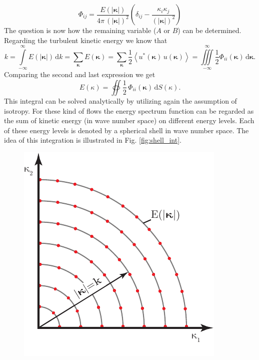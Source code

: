 \documentclass[preprint,12pt,ntfdMod]{elsarticle}
\begin{document}
\begin{par}
  \begin{equation}
  	\Phi_{ij}=\frac{E(|\boldsymbol\kappa|)}{4\pi\,(|\boldsymbol\kappa|)^2}\left(\delta_{ij}
  	-\frac{\kappa_i\kappa_j}{(|\boldsymbol\kappa|)^2}\right)
  \end{equation}
The question is now how the remaining variable ($A$ or $B$) can be determined. Regarding the turbulent kinetic
energy we know that
  \begin{equation}
      k=\int\limits_{-\infty}^{\infty}E(|\boldsymbol\kappa|)\,\mathrm{d}k
      =\sum\limits_{\boldsymbol\kappa}E(\boldsymbol\kappa)
      =\sum\limits_{\boldsymbol\kappa}\frac{1}{2}\left<u^{*}(\boldsymbol\kappa)\,u(\boldsymbol\kappa)\right>
      =\iiint\limits_{-\infty}^{\infty}\frac{1}{2}\Phi_{ii}(\boldsymbol\kappa)\,\mathrm{d}\boldsymbol\kappa.
  \end{equation}
Comparing the second and last expression we get
  \begin{equation}
      E(\kappa)=\oiint\frac{1}{2}\,\Phi_{ii}(\boldsymbol\kappa)\,\mathrm{d}S(\kappa).
  \end{equation}
This integral can be solved analytically by utilizing again the assumption of isotropy.
For these kind of flows the energy spectrum function can be regarded as the sum of kinetic energy
(in wave number space) on different energy levels. Each of these energy levels is denoted by a spherical
shell in wave number space. The idea of this integration is illustrated
in Fig. \ref{fig:shell_int}.
  \begin{figure}
      \centering
      \includegraphics[scale=1]{shell_integration}

\end{figure}
\end{par}
\end{document}
